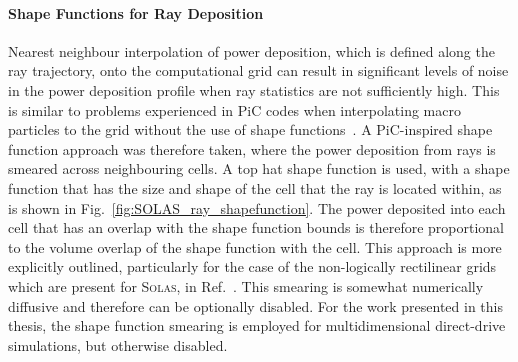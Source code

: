 \paragraph*{Shape Functions for Ray Deposition}
Nearest neighbour interpolation of power deposition, which is defined along the ray trajectory, onto the computational grid can result in significant levels of noise in the power deposition profile when ray statistics are not sufficiently high.
This is similar to problems experienced in \ac{PiC} codes when interpolating macro particles to the grid without the use of shape functions~\cite{birdsall_plasma_1985,arber_contemporary_2015}.
A \ac{PiC}-inspired shape function approach was therefore taken, where the power deposition from rays is smeared across neighbouring cells.
A top hat shape function is used, with a shape function that has the size and shape of the cell that the ray is located within, as is shown in Fig.~\ref{fig:SOLAS_ray_shapefunction}.
The power deposited into each cell that has an overlap with the shape function bounds is therefore proportional to the volume overlap of the shape function with the cell.
This approach is more explicitly outlined, particularly for the case of the non-logically rectilinear grids which are present for \textsc{Solas}, in Ref.~\cite{cornet_new_2007}.
This smearing is somewhat numerically diffusive and therefore can be optionally disabled.
For the work presented in this thesis, the shape function smearing is employed for multidimensional direct-drive simulations, but otherwise disabled.

